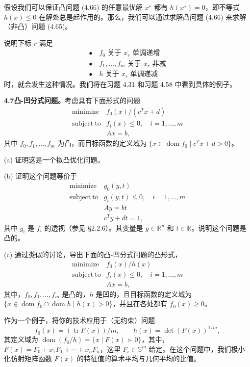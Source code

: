 \documentclass[UTF8, 12pt, fontset=fandol, oneside]{ctexart}
\begin{document}
假设我们可以保证凸问题 (4.66) 的任意最优解 $x^\star$ 都有 $h(x^\star)=0$，即不等式 $h(x)\leq0$ 在解处总是起作用的。那么，我们可以通过求解凸问题 (4.66) 来求解（非凸）问题 (4.65)。

说明下标 $r$ 满足
\[
\begin{array}{l}
\bullet\quad f_0\text{ 关于 }x_r\text{ 单调递增}\\
\bullet\quad f_1,\ldots,f_m\text{ 关于 }x_r\text{ 非减}\\
\bullet\quad h\text{ 关于 }x_r\text{ 单调递减}
\end{array}
\]
时，就会发生这种情况。我们将在习题 4.31 和习题 4.58 中看到具体的例子。

\noindent\textbf{4.7\quad 凸-凹分式问题。}\quad 考虑具有下面形式的问题
\[
\begin{array}{ll}
\mathop{\mathrm{minimize}} & f_0(x)/(c^Tx+d)\\
\mathrm{subject\ to} & f_i(x)\leq0,\quad i=1,\ldots,m\\
& Ax=b,
\end{array}
\]
其中 $f_0,f_1,\ldots,f_m$ 为凸，而目标函数的定义域为 $\{x\in\operatorname{dom} f_0\mid c^Tx+d>0\}$。

(a) 证明这是一个拟凸优化问题。

(b) 证明这个问题等价于
\[
\begin{array}{ll}
\mathop{\mathrm{minimize}} & g_0(y,t)\\
\mathrm{subject\ to} & g_i(y,t)\leq0,\quad i=1,\ldots,m\\
& Ay=bt\\
& c^Ty+dt=1,
\end{array}
\]
其中 $g_i$ 是 $f_i$ 的透视（参见 \S2.2.6）。其变量是 $y\in\mathbb{R}^n$ 和 $t\in\mathbb{R}$。说明这个问题是凸的。

(c) 通过类似的讨论，导出下面的凸-凹分式问题的凸形式，
\[
\begin{array}{ll}
\mathop{\mathrm{minimize}} & f_0(x)/h(x)\\
\mathrm{subject\ to} & f_i(x)\leq0,\quad i=1,\ldots,m\\
& Ax=b,
\end{array}
\]
其中，$f_0,f_1,\ldots,f_m$ 是凸的，$h$ 是凹的，且目标函数的定义域为 $\{x\in\operatorname{dom} f_0\cap\operatorname{dom} h\mid h(x)>0\}$，并且在各处都有 $f_0(x)\geq0$。

作为一个例子，将你的技术应用于（无约束）问题
\[
f_0(x)=(\operatorname{tr}F(x))/m,\qquad h(x)=\det(F(x))^{1/m},
\]
其定义域为 $\operatorname{dom}(f_0/h)=\{x\mid F(x)\succ0\}$，其中，$F(x)=F_0+x_1F_1+\cdots+x_nF_n$，这里 $F_i\in\mathbb{S}^m$ 给定。在这个问题中，我们极小化仿射矩阵函数 $F(x)$ 的特征值的算术平均与几何平均的比值。
\end{document}
